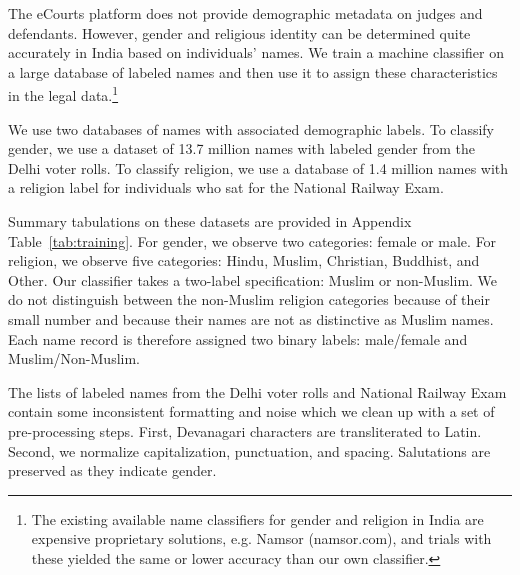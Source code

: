 \documentclass[12pt,english]{article}
\begin{document}
The eCourts platform does not provide demographic metadata on judges and defendants. However, gender and religious identity can be determined quite accurately in India based on individuals' names. We train a machine classifier on a large database of labeled names and then use it to assign these characteristics in the legal data.\footnote{The existing available name classifiers for gender and religion in India are expensive proprietary solutions, e.g. Namsor (namsor.com), and trials with these yielded the same or lower accuracy than our own classifier.}

We use two databases of names with associated demographic labels. To classify gender, we use a dataset of 13.7 million names with labeled gender from the Delhi voter rolls.  To classify religion, we use a database of 1.4 million names with a religion label for individuals who sat for the National Railway Exam.
  
Summary tabulations on these datasets are provided in Appendix Table~\ref{tab:training}. For gender, we observe two categories: female or male. For religion, we observe five categories: Hindu, Muslim, Christian, Buddhist, and Other. Our classifier takes a two-label specification: Muslim or non-Muslim. We do not distinguish between the non-Muslim religion categories because of their small number and because their names are not as distinctive as Muslim names. Each name record is therefore assigned two binary labels: male/female and Muslim/Non-Muslim.

The lists of labeled names from the Delhi voter rolls and National Railway Exam contain some inconsistent formatting and noise which we clean up with a set of pre-processing steps. First, Devanagari characters are transliterated to Latin. Second, we normalize capitalization, punctuation, and spacing. Salutations are preserved as they indicate gender.
\end{document}
